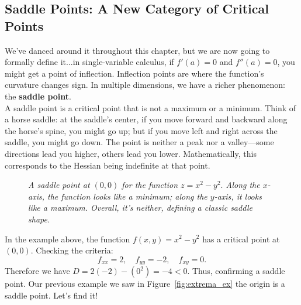 \subsection*{Saddle Points: A New Category of Critical Points}  

\noindent We've danced around it throughout this chapter, but we are now going to formally define it...in single-variable calculus, if \( f'(a)=0 \) and \( f''(a)=0 \), you might get a point of inflection. Inflection points are where the function’s curvature changes sign. In multiple dimensions, we have a richer phenomenon: the \textbf{saddle point}. \\

\noindent A saddle point is a critical point that is not a maximum or a minimum. Think of a horse saddle: at the saddle’s center, if you move forward and backward along the horse's spine, you might go up; but if you move left and right across the saddle, you might go down. The point is neither a peak nor a valley—some directions lead you higher, others lead you lower. Mathematically, this corresponds to the Hessian being indefinite at that point.

\begin{figure}[H]
\centering
{}
\caption{\textit{A saddle point at \((0,0)\) for the function \(z=x^2-y^2.\) Along the \(x\)-axis, the function looks like a minimum; along the \(y\)-axis, it looks like a maximum. Overall, it's neither, defining a classic saddle shape.}}
\end{figure}

\noindent In the example above, the function \( f(x,y)=x^2-y^2 \) has a critical point at \((0,0)\). Checking the criteria:
\[
f_{xx}=2,\quad f_{yy}=-2,\quad f_{xy}=0.
\]
Therefore we have $D = 2(-2) - (0^2) = -4 < 0$. Thus, confirming a saddle point. Our previous example we saw in Figure~\ref{fig:extrema_ex} the origin is a saddle point. Let's find it!



